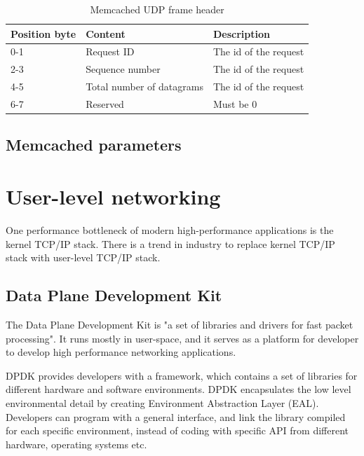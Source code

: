 \documentclass[bsc,frontabs,twoside,singlespacing,parskip,deptreport]{infthesis}     %
\begin{document}
\begin{table}[h]
\centering
\begin{tabular}{ |p{4cm}||p{4cm}||p{4cm}|  }

 \hline
 Position byte & Content & Description \\
 \hline
0-1  & Request ID  & The id of the request\\
 \hline
 2-3  & Sequence number  & The id of the request\\
 \hline
 4-5  & Total number of datagrams  & The id of the request\\
 \hline
 6-7  & Reserved  & Must be 0\\
 \hline

 
\end{tabular}
\caption{Memcached UDP frame header}
\label{tab:mem_proto_udp}


\end{table}




\subsection{Memcached parameters}
\label{parameter}






\section{User-level networking}
One performance bottleneck of modern high-performance applications is the kernel TCP/IP stack. There is a trend in industry to replace kernel TCP/IP stack with user-level TCP/IP stack.



\subsection{Data Plane Development Kit}


The Data Plane Development Kit is "a set of libraries and drivers for fast packet processing"\cite{dpdk}. It runs mostly in user-space, and it serves as a platform for developer to develop high performance networking applications.



DPDK provides developers with a framework, which contains a set of libraries for different hardware and software environments. DPDK encapsulates the low level environmental detail by creating Environment Abstraction Layer (EAL). Developers can program with a general interface, and link the library compiled for each specific environment, instead of coding with specific API from different hardware, operating systems etc.
\end{document}
